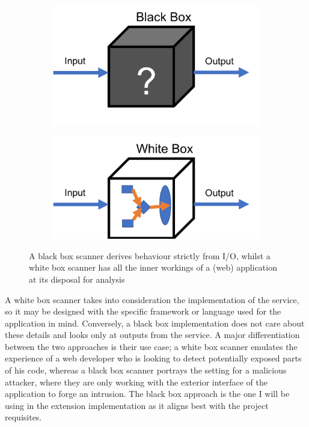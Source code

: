 \begin{figure}[h]
	\centering
	\begin{subfigure}{.5\textwidth}
		\centering
		\includegraphics[width=.8\linewidth]{images/black_box.png}
		\label{fig:blackBox}
	\end{subfigure}%
	\begin{subfigure}{.5\textwidth}
		\centering
		\includegraphics[width=.8\linewidth]{images/white_box.png}
		\label{fig:whiteBox}
	\end{subfigure}
	\caption{A black box scanner derives behaviour strictly from I/O, whilst a white box scanner has all the inner workings of a (web) application at its disposal for analysis}
	\label{fig:test}
\end{figure}


 A white box scanner takes into consideration the implementation of the service, so it may be designed with the specific framework or language used for the application in mind. Conversely, a black box implementation does not care about these details and looks only at outputs from the service. A major differentiation between the two approaches is their use case; a white box scanner emulates the experience of a web developer who is looking to detect potentially exposed parts of his code, whereas a black box scanner portrays the setting for a malicious attacker, where they are only working with the exterior interface of the application to forge an intrusion. The black box approach is the one I will be using in the extension implementation as it aligns best with the project requisites.

